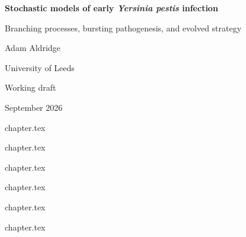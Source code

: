 \documentclass[11pt,a4paper]{report}
\newcommand{\stitchchapter}[2]{%
  \clearpage
  \graphicspath{{chapters/#1/}{chapters/#1/figures/}{chapters/#1/pictures/}}%
  \begingroup
  {#2}%
  \endgroup
  \FloatBarrier
}
\begin{document}
\hypersetup{pageanchor=false}
\begin{titlepage}
\centering
\vspace*{3.2cm}
{\LARGE\bfseries Stochastic models of early \textit{Yersinia pestis} infection\par}
\vspace{10pt}
{\large Branching processes, bursting pathogenesis, and evolved strategy\par}
\vspace{2.4cm}
{\large Adam Aldridge\par}
\vspace{6pt}
{University of Leeds\par}
\vspace{2.2cm}
{\large Working draft\par}
\vspace{4pt}
{September 2026\par}
\vfill
\vspace*{1.2cm}
\end{titlepage}
\hypersetup{pageanchor=true}







\begingroup
\setlength{\parskip}{0pt}
\tableofcontents
\endgroup
\clearpage

\stitchchapter{ch01}{chapter.tex}

\stitchchapter{ch02}{chapter.tex}

\stitchchapter{ch03}{chapter.tex}

\stitchchapter{ch04}{chapter.tex}

\stitchchapter{ch05}{chapter.tex}

\clearpage
\graphicspath{{chapters/ch06/}{chapters/ch06/figures/}}

\begingroup

{chapter.tex}
\endgroup

\FloatBarrier
\end{document}
